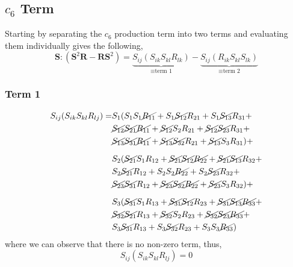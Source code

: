 \subsection{$c_{6}$ Term}
Starting by separating the $c_{6}$ production term into two terms
and evaluating them individually gives the following,
\begin{equation}
    \mathbf{S}:(\mathbf{S}^2\mathbf{R} - \mathbf{RS}^2) =
        \underbrace{S_{ij}(S_{ik}S_{kl}R_{lk})}_{\equiv \text{term 1}}
        -\underbrace{S_{ij}(R_{ik}S_{kl}S_{lk})}_{\equiv \text{term 2}}
\end{equation}
\subsubsection{Term 1}
\begin{equation}
    \begin{split}
        S_{ij}(S_{ik}S_{kl}R_{lj}) = & 
            S_{1}(
            S_{1}S_{1}\cancel{R_{11}} + S_{1}\cancel{S_{12}}R_{21} + S_{1}\cancel{S_{13}}R_{31} +   \\
        &   \cancel{S_{12}}\cancel{S_{21}}\cancel{R_{11}} + \cancel{S_{12}}S_{2}R_{21} + \cancel{S_{12}}\cancel{S_{23}}R_{31} +   \\
        &   \cancel{S_{13}}\cancel{S_{31}}\cancel{R_{11}} + \cancel{S_{13}}\cancel{S_{32}}R_{21} + \cancel{S_{13}}S_{3}R_{31} 
            ) +   \\[6pt]
        &   S_{2}(
            \cancel{S_{21}}S_{1}R_{12} + \cancel{S_{21}}\cancel{S_{12}}\cancel{R_{22}} + \cancel{S_{21}}\cancel{S_{13}}R_{32} +   \\
        &   S_{2}\cancel{S_{21}}R_{12} + S_{2}S_{2}\cancel{R_{22}} + S_{2}\cancel{S_{23}}R_{32} +   \\
        &   \cancel{S_{23}}\cancel{S_{31}}R_{12} + \cancel{S_{23}}\cancel{S_{32}}\cancel{R_{22}} + \cancel{S_{23}}S_{3}R_{32} 
            ) +   \\[6pt]
        &   S_{3}(
            \cancel{S_{31}}S_{1}R_{13} + \cancel{S_{31}}\cancel{S_{12}}R_{23} + \cancel{S_{31}}\cancel{S_{13}}\cancel{R_{33}} +   \\
        &   \cancel{S_{32}}\cancel{S_{21}}R_{13} + \cancel{S_{32}}S_{2}R_{23} + \cancel{S_{32}}\cancel{S_{23}}\cancel{R_{33}} +   \\
        &   S_{3}\cancel{S_{31}}R_{13} + S_{3}\cancel{S_{32}}R_{23} + S_{3}S_{3}\cancel{R_{33}} )
    \end{split}
\end{equation}
where we can observe that there is no non-zero term, thus,
\begin{equation}
        S_{ij}(S_{ik}S_{kl}R_{lj}) = 0
\end{equation}
